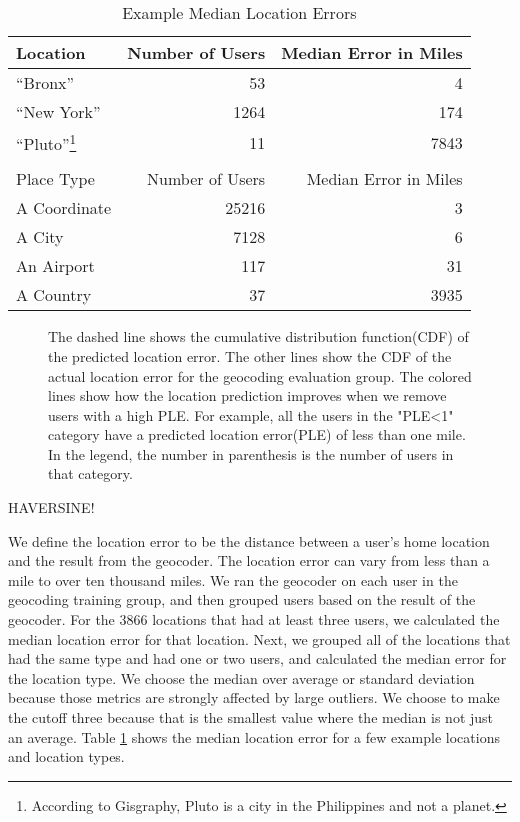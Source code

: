 \documentclass{sig-alternate}
\begin{document}
\begin{table}
\centering
\caption{Example Median Location Errors}
\begin{tabular}{l r r} 
Location&Number of Users&Median Error in Miles\\ \hline
``Bronx''&53&4\\
``New York''&1264&174\\
``Pluto''\footnote{According to Gisgraphy, Pluto is a city in the Philippines and not a planet.}&11&7843\\ \hline
\\
Place Type&Number of Users&Median Error in Miles\\ \hline
A Coordinate&25216&3\\
A City&7128&6\\
An Airport&117&31\\
A Country&37&3935\\
\hline\end{tabular}
\label{tab:MedianLocErr}
\end{table}

\begin{figure}
\centering
{}
\caption{
The dashed line shows the cumulative distribution function(CDF) of the predicted location error.
The other lines show the CDF of the actual location error for the geocoding evaluation group. The colored lines show how the location prediction improves when we remove users with a high PLE. For example, all the users in the "PLE<1" category have a predicted location error(PLE) of less than one mile.
In the legend, the number in parenthesis is the number of users in that category.
}
\label{fig:DiffGnpGps}
\end{figure}


\textsc{HAVERSINE!}

We define the location error to be the distance between a user's home location and the result from the geocoder.
The location error can vary from less than a mile to over ten thousand miles.
We ran the geocoder on each user in the geocoding training group, and then grouped users based on the result of the geocoder.
For the 3866 locations that had at least three users, we calculated the median location error for that location.
Next, we grouped all of the locations that had the same type and had one or two users, and calculated the median error for the location type.
We choose the median over average or standard deviation because those metrics are strongly affected by large outliers.
We choose to make the cutoff three because that is the smallest value where the median is not just an average.
Table \ref{tab:MedianLocErr} shows the median location error for a few example locations and location types.
\end{document}
